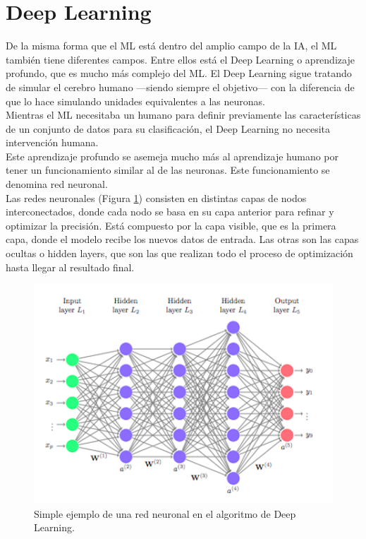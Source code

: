 \section{Deep Learning}
De la misma forma que el ML está dentro del amplio campo de la IA, el ML también tiene diferentes campos. Entre ellos está el Deep Learning o aprendizaje profundo, que es mucho más complejo del ML. El Deep Learning sigue tratando de simular el cerebro humano ---siendo siempre el objetivo--- con la diferencia de que lo hace simulando unidades equivalentes a las neuronas.\\
Mientras el ML necesitaba un humano para definir previamente las características de un conjunto de datos para su clasificación, el Deep Learning no necesita intervención humana.\\
Este aprendizaje profundo se asemeja mucho más al aprendizaje humano por tener un funcionamiento similar al de las neuronas. Este funcionamiento se denomina red neuronal.\\

Las redes neuronales (Figura \ref{fig:red}) consisten en distintas capas de nodos interconectados, donde cada nodo se basa en su capa anterior para refinar y optimizar la precisión. Está compuesto por la capa visible, que es la primera capa, donde el modelo recibe los nuevos datos de entrada. Las otras son las capas ocultas o hidden layers, que son las que realizan todo el proceso de optimización hasta llegar al resultado final.\\
\begin{figure} [h!]
  \begin{center}
    \includegraphics[width=12cm]{figs/deep_learning}
  \end{center}
  \caption[]{Simple ejemplo de una red neuronal en el algoritmo de Deep Learning. \footnotemark}
  \label{fig:red}
\end{figure}\\

